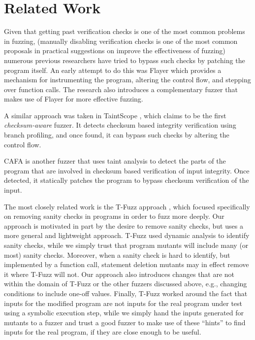 \section{Related Work}

Given that getting past verification checks is one of the most common problems in fuzzing,
(manually disabling verification checks is one of the most common proposals in practical \cite{chromeadvice}
suggestions on improve the effectiveness of fuzzing)
numerous previous researchers have tried to bypass such checks by
patching the program itself.
An early attempt to do this was Flayer \cite{drewry2O07flayer} which
provides a mechanism for instrumenting the program, altering the control flow,
and stepping over function calls. The research also introduces a complementary
fuzzer that makes use of Flayer for more effective fuzzing.

A similar approach was taken in TaintScope \cite{wang2010taintscope}, which claims to be the first \emph{checksum-aware} fuzzer. It detects checksum
based integrity verification using branch profiling, and once found, it can
bypass such checks by altering the control flow.

CAFA \cite{liu2018cafa} is another fuzzer that uses taint analysis to detect the
parts of the program that are involved in checksum based verification of
input integrity. Once detected, it statically patches the program to bypass
checksum verification of the input.

The most closely related work is the T-Fuzz approach \cite{tfuzz}, which focused specifically on removing sanity checks in programs in order to fuzz more deeply.  Our approach is motivated in part by the desire to remove sanity checks, but uses a more general and lightweight approach.  T-Fuzz used dynamic analysis to identify sanity checks, while we simply trust that program mutants will include many (or most) sanity checks.  Moreover, when a sanity check is hard to identify, but implemented by a function call, statement deletion mutants may in effect remove it where T-Fuzz will not.  Our approach also introduces changes that are not within the domain of T-Fuzz or the other fuzzers discussed above, e.g., changing conditions to include one-off values.  Finally, T-Fuzz worked around the fact that inputs for the modified program are not inputs for the real program under test using a symbolic execution step, while we simply hand the inputs generated for mutants to a fuzzer and trust a good fuzzer to make use of these ``hints'' to find inputs for the real program, if they are close enough to be useful.


